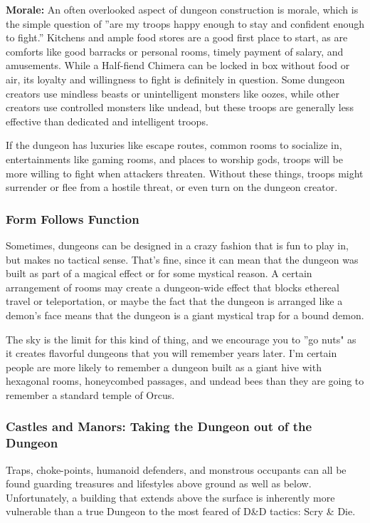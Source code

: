 \textbf{Morale:} An often overlooked aspect of dungeon construction is morale, which is the simple question of ''are my troops happy enough to stay and confident enough to fight.'' Kitchens and ample food stores are a good first place to start, as are comforts like good barracks or personal rooms, timely payment of salary, and amusements. While a Half-fiend Chimera can be locked in box without food or air, its loyalty and willingness to fight is definitely in question. Some dungeon creators use mindless beasts or unintelligent monsters like oozes, while other creators use controlled monsters like undead, but these troops are generally less effective than dedicated and intelligent troops.

If the dungeon has luxuries like escape routes, common rooms to socialize in, entertainments like gaming rooms, and places to worship gods, troops will be more willing to fight when attackers threaten. Without these things, troops might surrender or flee from a hostile threat, or even turn on the dungeon creator.

\subsubsection{Form Follows Function}

Sometimes, dungeons can be designed in a crazy fashion that is fun to play in, but makes no tactical sense. That's fine, since it can mean that the dungeon was built as part of a magical effect or for some mystical reason. A certain arrangement of rooms may create a dungeon-wide effect that blocks ethereal travel or teleportation, or maybe the fact that the dungeon is arranged like a demon's face means that the dungeon is a giant mystical trap for a bound demon.

The sky is the limit for this kind of thing, and we encourage you to ''go nuts" as it creates flavorful dungeons that you will remember years later. I'm certain people are more likely to remember a dungeon built as a giant hive with hexagonal rooms, honeycombed passages, and undead bees than they are going to remember a standard temple of Orcus.

\subsubsection{Castles and Manors: Taking the Dungeon out of the Dungeon}

Traps, choke-points, humanoid defenders, and monstrous occupants can all be found guarding treasures and lifestyles above ground as well as below. Unfortunately, a building that extends above the surface is inherently more vulnerable than a true Dungeon to the most feared of D\&D tactics: Scry \& Die.

